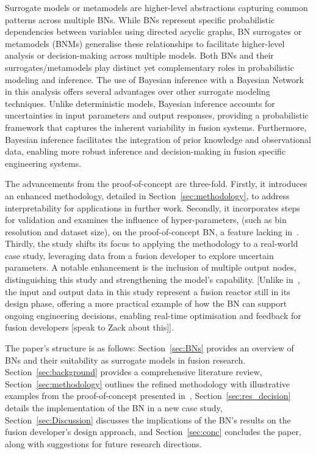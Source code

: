 \documentclass[journal]{IEEEtran}
\begin{document}
Surrogate models or metamodels are higher-level abstractions capturing common patterns across multiple BNs. While BNs represent specific probabilistic dependencies between variables using directed acyclic graphs, BN surrogates or metamodels (BNMs) generalise these relationships to facilitate higher-level analysis or decision-making across multiple models. Both BNs and their surrogates/metamodels play distinct yet complementary roles in probabilistic modeling and inference. The use of Bayesian inference with a Bayesian Network in this analysis offers several advantages over other surrogate modeling techniques. Unlike deterministic models, Bayesian inference accounts for uncertainties in input parameters and output responses, providing a probabilistic framework that captures the inherent variability in fusion systems. Furthermore, Bayesian inference facilitates the integration of prior knowledge and observational data, enabling more robust inference and decision-making in fusion specific engineering systems.

The advancements from the proof-of-concept are three-fold. Firstly, it introduces an enhanced methodology, detailed in Section~\ref{sec:methodology}, to address interpretability for applications in further work. Secondly, it incorporates steps for validation and examines the influence of hyper-parameters, (such as bin resolution and dataset size), on the proof-of-concept BN, a feature lacking in~\cite{Griffiths2024}. Thirdly, the study shifts its focus to applying the methodology to a real-world case study, leveraging data from a fusion developer to explore uncertain parameters. A notable enhancement is the inclusion of multiple output nodes, distinguishing this study and strengthening the model's capability. [Unlike in~\cite{Griffiths2024}, the input and output data in this study represent a fusion reactor still in its design phase, offering a more practical example of how the BN can support ongoing engineering decisions, enabling real-time optimisation and feedback for fusion developers [speak to Zack about this]].

The paper's structure is as follows: Section~\ref{sec:BNs} provides an overview of BNs and their suitability as surrogate models in fusion research. Section~\ref{sec:background} provides a comprehensive literature review, Section~\ref{sec:methodology} outlines the refined methodology with illustrative examples from the proof-of-concept presented in~\cite{Griffiths2024}, Section~\ref{sec:res_decision} details the implementation of the BN in a new case study, Section~\ref{sec:Discussion} discusses the implications of the BN's results on the fusion developer's design approach, and Section~\ref{sec:conc} concludes the paper, along with suggestions for future research directions.
\end{document}
